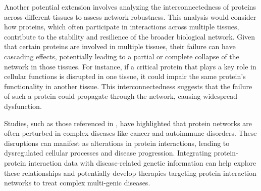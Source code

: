 \documentclass[paper=a4,fontsize=11pt,DIV=8,BCOR=5mm,oneside,pdftex,bibtotocnumbered]{scrreprt}
\theoremstyle{plain}
\begin{document}
	Another potential extension involves analyzing the interconnectedness of proteins across different tissues to assess network robustness. This analysis would consider how proteins, which often participate in interactions across multiple tissues, contribute to the stability and resilience of the broader biological network. Given that certain proteins are involved in multiple tissues, their failure can have cascading effects, potentially leading to a partial or complete collapse of the network in those tissues. For instance, if a critical protein that plays a key role in cellular functions is disrupted in one tissue, it could impair the same protein's functionality in another tissue. This interconnectedness suggests that the failure of such a protein could propagate through the network, causing widespread dysfunction.
	
	Studies, such as those referenced in \cite{SafariAlighiarloo2014}, have highlighted that protein networks are often perturbed in complex diseases like cancer and autoimmune disorders. These disruptions can manifest as alterations in protein interactions, leading to dysregulated cellular processes and disease progression. Integrating protein-protein interaction data with disease-related genetic information can help explore these relationships and potentially develop therapies targeting protein interaction networks to treat complex multi-genic diseases.
	
	


\end{document}
